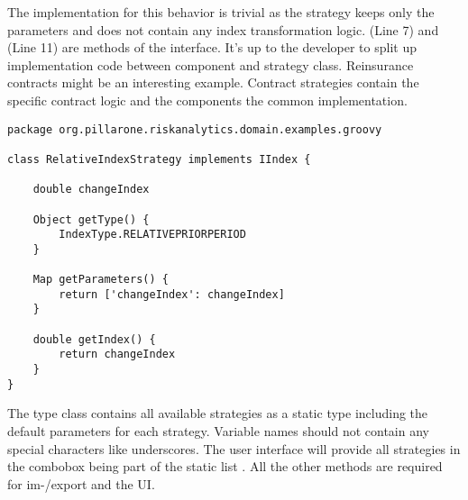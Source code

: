 The implementation for this behavior is trivial as the strategy keeps only the parameters and does not contain any index transformation logic.  (Line 7) and  (Line 11) are methods of the  interface. It's up to the developer to split up implementation code between component and strategy class. Reinsurance contracts might be an interesting example. Contract strategies contain the specific contract logic and the components the common implementation.
\begin{lstlisting}[label=lst:strategyimplementation]
package org.pillarone.riskanalytics.domain.examples.groovy

class RelativeIndexStrategy implements IIndex {

    double changeIndex

    Object getType() {
        IndexType.RELATIVEPRIORPERIOD
    }

    Map getParameters() {
        return ['changeIndex': changeIndex]
    }

    double getIndex() {
        return changeIndex
    }
}
\end{lstlisting}

The type class contains all available strategies as a static type including the default parameters for each strategy. Variable names should not contain any special characters like underscores. The user interface will provide all strategies in the combobox being part of the static list . All the other methods are required \eg for im-/export and the UI.

